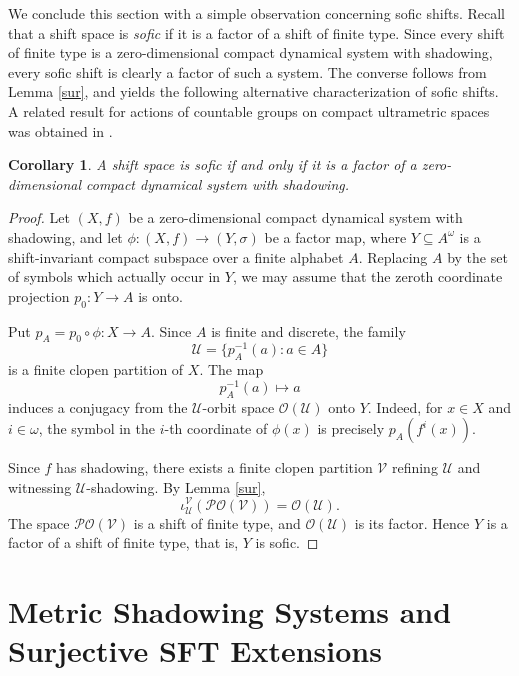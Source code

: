 \documentclass[12pt]{amsart}
\newtheorem{corollary}[theorem]{Corollary}
\theoremstyle{definition}
\numberwithin{equation}{section}
\theoremstyle{remark}
\begin{document}
We conclude this section with a simple observation concerning sofic shifts.
Recall that a shift space is \emph{sofic} if it is a factor of a shift of
finite type. Since every shift of finite type is a zero-dimensional compact
dynamical system with shadowing, every sofic shift is clearly a factor of such
a system. The converse follows from Lemma \ref{sur}, and yields the following
alternative characterization of sofic shifts. A related result for actions of
countable groups on compact ultrametric spaces was obtained in \cite{Dou}.

\begin{corollary}
A shift space is sofic if and only if it is a factor of a zero-dimensional
compact dynamical system with shadowing.
\end{corollary}



\begin{proof}
Let $(X,f)$ be a zero-dimensional compact dynamical system with shadowing, and
let $\phi:(X,f)\to (Y,\sigma)$ be a factor map, where $Y\subseteq A^\omega$ is a
shift-invariant compact subspace over a finite alphabet $A$. Replacing $A$ by
the set of symbols which actually occur in $Y$, we may assume that the zeroth
coordinate projection $p_0:Y\to A$ is onto.

Put $p_A=p_0\circ\phi:X\to A$. Since $A$ is finite and discrete, the family
\[
    \mathcal U=\{p_A^{-1}(a):a\in A\}
\]
is a finite clopen partition of $X$. The map
\[
    p_A^{-1}(a)\longmapsto a
\]
induces a conjugacy from the $\mathcal U$-orbit space $\mathcal O(\mathcal U)$
onto $Y$. Indeed, for $x\in X$ and $i\in\omega$, the symbol in the $i$-th
coordinate of $\phi(x)$ is precisely $p_A(f^i(x))$.

Since $f$ has shadowing, there exists a finite clopen partition $\mathcal V$
refining $\mathcal U$ and witnessing $\mathcal U$-shadowing. By Lemma
\ref{sur},
\[
    \iota_{\mathcal U}^{\mathcal V}(\mathcal{PO}(\mathcal V))
    =
    \mathcal O(\mathcal U).
\]
The space $\mathcal{PO}(\mathcal V)$ is a shift of finite type, and
$\mathcal O(\mathcal U)$ is its factor. Hence $Y$ is a factor of a shift of
finite type, that is, $Y$ is sofic.
\end{proof}



\section{Metric Shadowing Systems and Surjective SFT Extensions}\label{s2}
\end{document}
